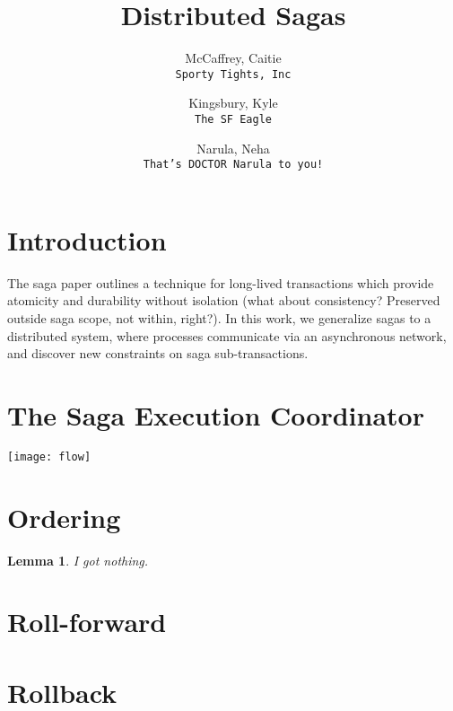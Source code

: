 \documentclass{article}
\author{
  McCaffrey, Caitie\\
  \texttt{Sporty Tights, Inc}
  \and
  Kingsbury, Kyle\\
  \texttt{The SF Eagle}
  \and
  Narula, Neha\\
  \texttt{That's DOCTOR Narula to you!}
}
\title{Distributed Sagas}
\newtheorem{lemma}{Lemma}[section]
\begin{document}
\maketitle

\section{Introduction}

The saga paper outlines a technique for long-lived transactions which provide
atomicity and durability without isolation (what about consistency? Preserved
outside saga scope, not within, right?). In this work, we generalize sagas to
a distributed system, where processes communicate via an asynchronous network,
and discover new constraints on saga sub-transactions.


\section{The Saga Execution Coordinator}

\texttt{[image: flow]}

\section{Ordering}

\begin{lemma}
I got nothing.
\end{lemma}

\section{Roll-forward}

\section{Rollback}
\end{document}
